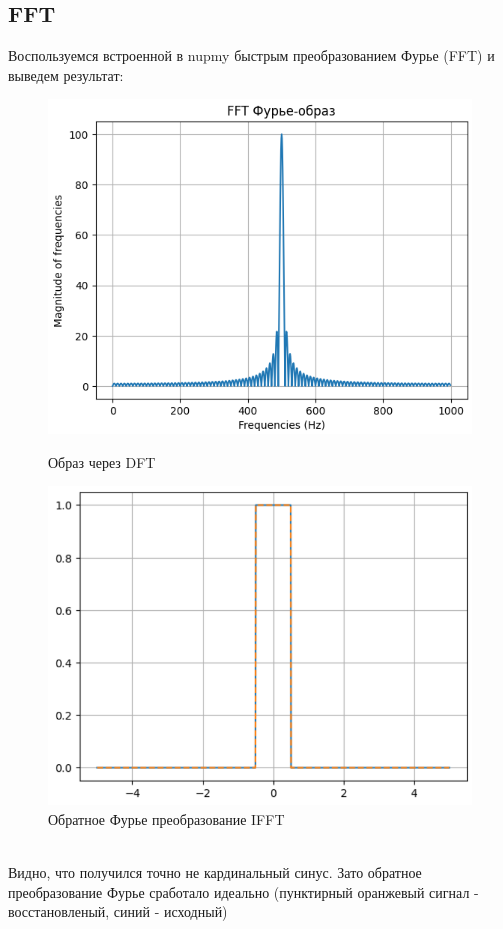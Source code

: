\subsection{FFT}
\noindent Воспользуемся встроенной в nupmy быстрым преобразованием Фурье (FFT) и выведем результат: 
\begin{figure}[!htb]
    \includegraphics[width=\linewidth]{../img/4}
    \caption{Образ через DFT}
    \endminipage\hfill
    \includegraphics[width=\linewidth]{../img/5}   
    \caption{Обратное Фурье преобразование IFFT}
    \endminipage\hfill
\end{figure}
\\
Видно, что получился точно не кардинальный синус.
Зато обратное преобразование Фурье сработало идеально
(пунктирный оранжевый сигнал - восстановленый, синий - исходный)

